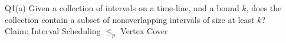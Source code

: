 \begin{problem}
    {Q1(a)}
    Given a collection of intervals on a time-line, and a bound $k$, does the collection contain a subset of nonoverlapping intervals of size at least $k$? \\
    Claim: Interval Scheduling $\leq_p$ Vertex Cover \\
\end{problem}
